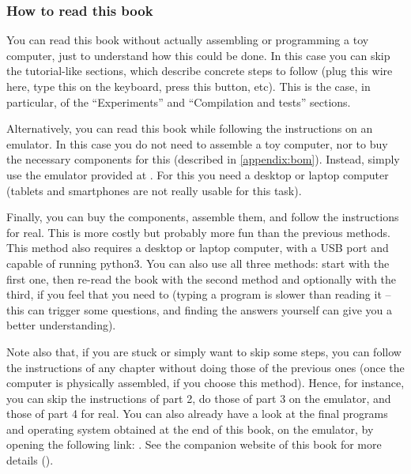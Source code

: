 \subsubsection{How to read this book}

You can read this book without actually assembling or programming a toy
computer, just to understand how this could be done. In this case you can skip
the tutorial-like sections, which describe concrete steps to follow (plug this
wire here, type this on the keyboard, press this button, etc). This is the
case, in particular, of the ``Experiments'' and ``Compilation and tests''
sections.

Alternatively, you can read this book while following the instructions on an
emulator. In this case you do not need to assemble a toy computer, nor to buy
the necessary components for this (described in \cref{appendix:bom}). Instead,
simply use the emulator provided at . For this you need
a desktop or laptop computer (tablets and smartphones are not really usable for
this task).

Finally, you can buy the components, assemble them, and follow the instructions
for real. This is more costly but probably more fun than the previous methods.
This method also requires a desktop or laptop computer, with a USB port and
capable of running python3. You can also use all three methods: start with the
first one, then re-read the book with the second method and optionally with the
third, if you feel that you need to (typing a program is slower than reading it
-- this can trigger some questions, and finding the answers yourself can give
you a better understanding).

Note also that, if you are stuck or simply want to skip some steps, you can
follow the instructions of any chapter without doing those of the previous ones
(once the computer is physically assembled, if you choose this method). Hence,
for instance, you can skip the instructions of part 2, do those of part 3 on
the emulator, and those of part 4 for real. You can also already have a look at
the final programs and operating system obtained at the end of this book, on
the emulator, by opening the following link:
. See the companion website of
this book for more details (\toypcurl{}).
